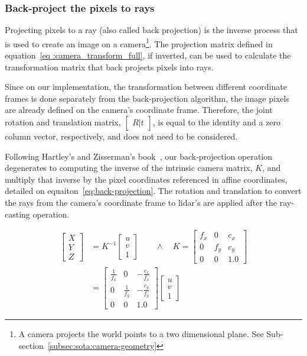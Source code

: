 \subsubsection{Back-project the pixels to rays}
Projecting pixels to a ray (also called back projection) is the inverse process that is used to create an image on a camera\footnote{A camera projects the world points to a two dimensional plane. See Sub-section~\ref{subsec:sota:camera-geometry}}. The projection matrix defined in equation~\ref{eq :camera_transform_full}, if inverted, can be used to calculate the transformation matrix that  back projects pixels into rays.

Since on our implementation, the transformation between different coordinate frames is done separately from the back-projection algorithm, the image pixels are already defined on the camera's coordinate frame. Therefore, the joint rotation and translation matrix, $\begin{bmatrix} R|t \end{bmatrix}$, is equal to the identity and a zero column vector, respectively, and does not need to be considered.

Following Hartley's and Zisserman's book~\cite{mvg_book}, our back-projection operation degenerates to computing the inverse of the intrinsic camera matrix, $K$, and multiply that inverse by the pixel coordinates referenced in affine coordinates, detailed on equaiton~\ref{eq:back-projection}. The rotation and translation to convert the rays from the camera's coordinate frame to \ac{lidar}'s are applied after the ray-casting operation.

\begin{align}
	\label{eq:back-projection}
	\begin{bmatrix}
		X \\
		Y \\
		Z
	\end{bmatrix}
	 & = K^{-1} 
	\begin{bmatrix}
		u \\
		v \\
		1
	\end{bmatrix}
\qquad \wedge \quad
	K = 
	\begin{bmatrix}
		f_x & 0 & c_x \\
		0 & f_y & c_y \\
		0 & 0 & 1.0
	\end{bmatrix}
\nonumber \\	 
	&  = 
	\begin{bmatrix}
	\frac{1}{f_x} & 0 & -\frac{c_x}{f_x} \\
	0 & \frac{1}{f_y}  & -\frac{c_y}{f_y} \\
	0 & 0 & 1.0 
	\end{bmatrix}
	\begin{bmatrix}
		u \\
		v \\
		1
	\end{bmatrix}
\end{align}

